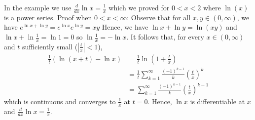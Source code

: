 \documentclass{tufte-handout}
\makeatletter
\renewcommand{\section}{\@startsection{section}%
    {3}{-1.01em}{-3ex \@plus -1ex \@minus -.2ex}%
    {1.5ex \@plus .2ex}
    {\hspace*{-5.5em}\fcolorbox{blue}{blue}{\parbox[c][1.0ex][b]{4em}{\phantom{space}}}
    \normalfont\Large\itshape\color{blue}}}
\makeatother
\begin{document}
In the example we use \( \frac{d}{dx}\ln x = \frac{1}{x} \) which we proved for 
\(0<x<2\) where \( \ln(x) \) is a power series.
Proof when \(0<x<\infty\):
Observe that for all \( x,y \in (0,\infty) \), we have
\( 
    e^{\ln x + \ln y} = e^{\ln x}e^{\ln y} = xy
 \)
Hence, we have
    \( 
    \ln x + \ln y = \ln(xy)
     \)
and \(\ln x + \ln \frac1x = \ln 1 = 0\) so \( \ln \frac1x = -\ln x \).
It follows that, for every \( x \in (0,\infty) \) and \( t \) sufficiently small (\(|\frac{t}{x}| < 1\)),
\begin{align}
    \frac{1}{t}\left(
        \ln (x+t) - \ln x
    \right) &= \frac{1}{t}\ln\left(1 + \frac{t}{x}\right) \\
    &= \frac{1}{t} \sum_{k=1}^{\infty} \frac{(-1)^{k-1}}{k}\left(\frac{t}{x}\right)^k\\
    &= \sum_{k=1}^{\infty} \frac{(-1)^{k-1}}{k}\left(\frac{t}{x}\right)^{k-1} 
\end{align}
which is continuous and converges to \( \frac{1}{x} \) at \( t=0 \).
Hence, \( \ln x \) is differentiable at \( x \) and \( \frac{d}{dx}\ln x = \frac{1}{x} \).







\makeatletter
  \renewcommand{\section}{\@startsection{section}%
    {3}{0.8em}{-3ex \@plus -1ex \@minus -.2ex}%
    {1.5ex \@plus .2ex}
    {\hspace*{-5.5em}\fcolorbox{Periwinkle}{Periwinkle}{\parbox[c][1.0ex][b]{4em}{\phantom{space}}}
    \normalfont\Large\itshape\color{blue}}}
\makeatother



\end{document}
